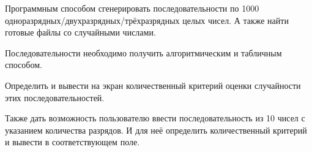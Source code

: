 Программным способом сгенерировать последовательности по 1000  одноразрядных/двухразрядных/трёхразрядных целых чисел. А также найти готовые файлы со случайными числами. 

Последовательности необходимо получить алгоритмическим и табличным способом.

Определить и вывести на экран количественный критерий оценки случайности этих последовательностей.

Также дать возможность пользователю ввести последовательность из 10 чисел с указанием количества разрядов. И для неё определить количественный критерий и вывести в соответствующем поле.